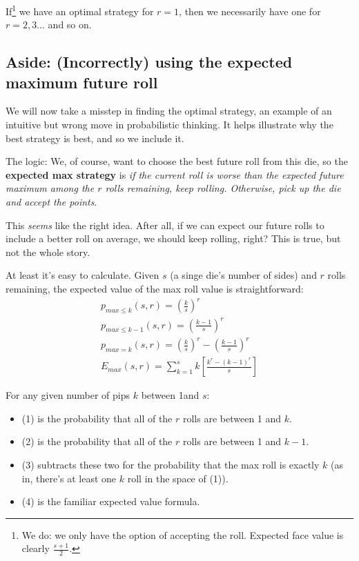 \documentclass[11pt, oneside]{article} 	%
\begin{document}

If\footnote{We do: we only have the option of accepting the roll. Expected face value is clearly $\frac{s+1}{2}$.} we have an optimal strategy for $r=1$, then we necessarily have one for $r=2, 3... $ and so on.

\subsection{Aside: (Incorrectly) using the expected maximum future roll}

We will now take a misstep in finding the optimal strategy, an example of an intuitive but wrong move in probabilistic thinking. It helps illustrate why the best strategy is best, and so we include it.

The logic: We, of course, want to choose the best future roll from this die, so the \textbf{expected max strategy} is \emph{if the current roll is worse than the expected future maximum among the $r$ rolls remaining, keep rolling. Otherwise, pick up the die and accept the points}.

This \emph{seems} like the right idea. After all, if we can expect our future rolls to include a better roll on average, we should keep rolling, right?  This is true, but not the whole story. 

At least it's easy to calculate. Given $s$ (a singe die's number of sides) and $r$ rolls remaining, the expected value of the max roll value is straightforward:
\begin{align}
p_{max \leq k}(s,r) =  (\frac{k}{s})^r \\
p_{max \leq k-1}(s,r) =  (\frac{k-1}{s})^r \\
p_{max = k}(s,r) =  (\frac{k}{s})^r - (\frac{k-1}{s})^r \\
E_{max}(s,r) = \sum_{k=1}^s k[\frac{k^r - (k-1)^r}{s}]
\end{align}

For any given number of pips $k$ between 1and $s$:
\begin{itemize}
\item (1) is the probability that all of the $r$ rolls are between 1 and $k$.
\item (2) is the probability that all of the $r$ rolls are between 1 and $k-1$.
\item (3) subtracts these two for the probability that the max roll is exactly $k$ (as in, there's at least one $k$ roll in the space of (1)).
\item (4) is the familiar expected value formula.
\end{itemize}
\end{document}
